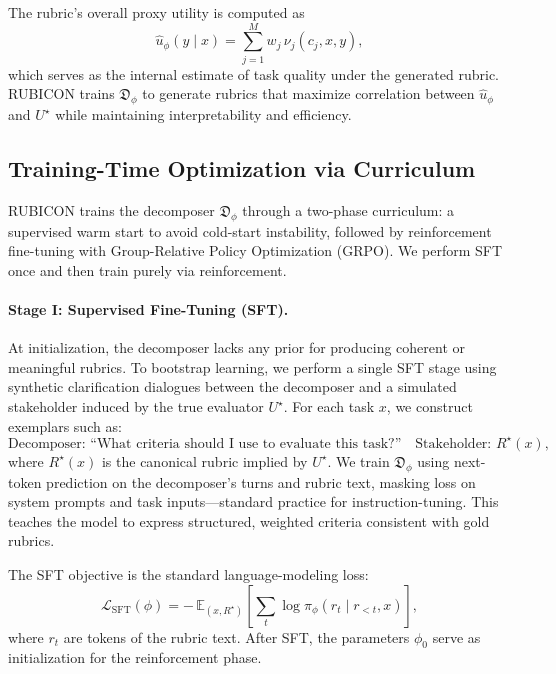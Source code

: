 \documentclass[sigconf]{acmart}
\begin{document}
The rubric’s overall proxy utility is computed as
\begin{equation}
\hat{u}_\phi(y\mid x) = \sum_{j=1}^M w_j\, \nu_j(c_j, x, y),
\label{eq:rubric-utility}
\end{equation}
which serves as the internal estimate of task quality under the generated rubric. RUBICON trains $\mathfrak{D}_\phi$ to generate rubrics that maximize correlation between $\hat{u}_\phi$ and $U^\star$ while maintaining interpretability and efficiency.

\subsection{Training-Time Optimization via Curriculum}
\label{sec:training}

RUBICON trains the decomposer $\mathfrak{D}_\phi$ through a two-phase curriculum:
a supervised warm start to avoid cold-start instability,
followed by reinforcement fine-tuning with Group-Relative Policy Optimization (GRPO).
We perform SFT once and then train purely via reinforcement.

\paragraph{Stage I: Supervised Fine-Tuning (SFT).}
At initialization, the decomposer lacks any prior for producing coherent or meaningful rubrics.
To bootstrap learning, we perform a single SFT stage using synthetic clarification dialogues
between the decomposer and a simulated stakeholder induced by the true evaluator \(U^\star\).
For each task \(x\), we construct exemplars such as:
\[
\text{Decomposer: ``What criteria should I use to evaluate this task?''} \quad
\text{Stakeholder: } R^\star(x),
\]
where \(R^\star(x)\) is the canonical rubric implied by \(U^\star\).
We train $\mathfrak{D}_\phi$ using next-token prediction on the decomposer’s turns and rubric text,
masking loss on system prompts and task inputs—standard practice for instruction-tuning.
This teaches the model to express structured, weighted criteria consistent with gold rubrics.

The SFT objective is the standard language-modeling loss:
\begin{equation}
\mathcal{L}_{\mathrm{SFT}}(\phi)
= -\,\mathbb{E}_{(x, R^\star)}\!\left[
\sum_{t} \log \pi_\phi(r_t \mid r_{<t}, x)
\right],
\label{eq:sft-loss}
\end{equation}
where $r_t$ are tokens of the rubric text.
After SFT, the parameters $\phi_0$ serve as initialization for the reinforcement phase.
\end{document}
